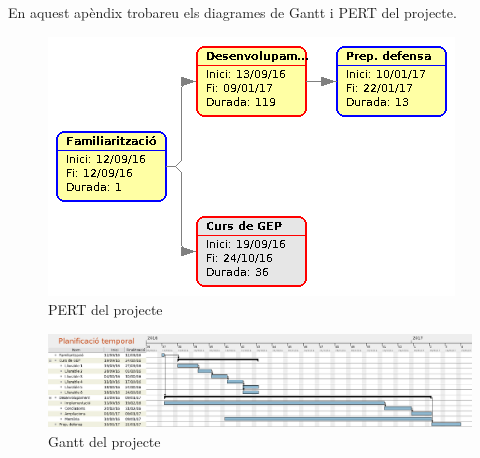 En aquest apèndix trobareu els diagrames de Gantt i PERT del projecte.
	\begin{figure}[H]
		\centering
		\includegraphics[width=\textwidth]{images/pert-global}
		\caption{PERT del projecte}
	\end{figure}

	\restoregeometry
	\thispagestyle{empty}
	\begin{figure}
		\includegraphics[width=\textheight]{images/gantt}
		\caption{Gantt del projecte}
	\end{figure}

\restoregeometry
{}


